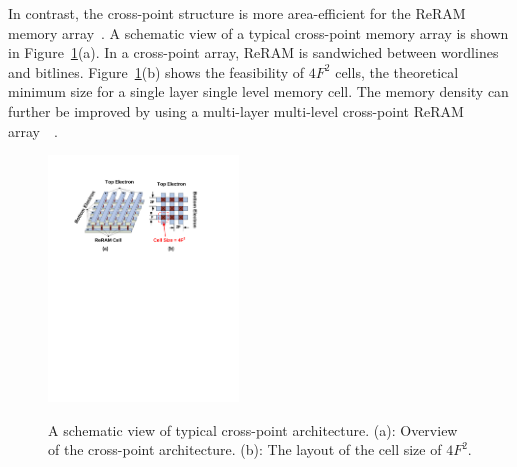 In contrast, the cross-point structure is more area-efficient for the ReRAM memory array~\cite{memristor:Cong}. A schematic view of a typical cross-point memory array is shown in Figure~\ref{fig:array}(a). In a cross-point array, ReRAM is sandwiched between wordlines and bitlines. Figure~\ref{fig:array}(b) shows the feasibility of $4F^2$ cells, the theoretical minimum size for a single layer single level memory cell.
The memory density can further be improved by using a multi-layer multi-level cross-point ReRAM array~\cite{ReRAM_ISSCC2011_Sheu}~\cite{memristor:IEDM08_3D}.

\begin{figure}
\centering
  \includegraphics[width=0.45\textwidth]{./figures/crossbar_array2.pdf}\\\vspace{-10pt}
  \caption{A schematic view of typical cross-point architecture. (a): Overview of the cross-point architecture. (b): The layout of the cell size of $4F^2$. }\label{fig:array}
\vspace{-12pt}
\end{figure}

